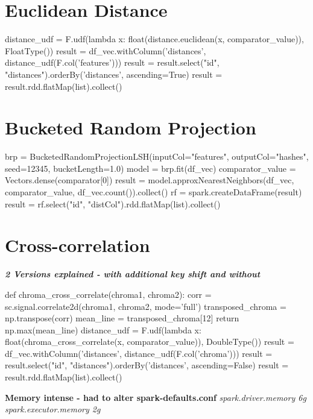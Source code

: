 \section{Euclidean Distance}

\begin{pythonCode}
distance_udf = F.udf(lambda x: float(distance.euclidean(x, comparator_value)), FloatType())
result = df_vec.withColumn('distances', distance_udf(F.col('features')))
result = result.select("id", "distances").orderBy('distances', ascending=True)
result = result.rdd.flatMap(list).collect()
\end{pythonCode}

\section{Bucketed Random Projection}

\begin{pythonCode}
brp = BucketedRandomProjectionLSH(inputCol="features", outputCol="hashes", seed=12345, bucketLength=1.0)
model = brp.fit(df_vec)
comparator_value = Vectors.dense(comparator[0])
result = model.approxNearestNeighbors(df_vec, comparator_value, df_vec.count()).collect()
rf = spark.createDataFrame(result)
result = rf.select("id", "distCol").rdd.flatMap(list).collect()
\end{pythonCode}


\section{Cross-correlation}

\textit{\textbf{2 Versions explained - with additional key shift and without}}

\begin{pythonCode}
def chroma_cross_correlate(chroma1, chroma2):
    corr = sc.signal.correlate2d(chroma1, chroma2, mode='full') 
    transposed_chroma = np.transpose(corr)
    mean_line = transposed_chroma[12]
    return np.max(mean_line)
distance_udf = F.udf(lambda x: float(chroma_cross_correlate(x, comparator_value)), DoubleType())
result = df_vec.withColumn('distances', distance_udf(F.col('chroma')))
result = result.select("id", "distances").orderBy('distances', ascending=False)
result = result.rdd.flatMap(list).collect()
\end{pythonCode}


\textbf{Memory intense - had to alter spark-defaults.conf}
\textit{spark.driver.memory             6g\\
spark.executor.memory           2g\\
}


